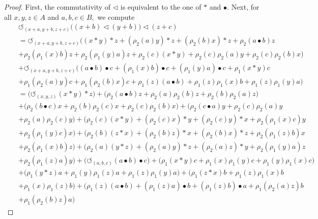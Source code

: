 \documentclass[12pt]{amsart}
\begin{document}
	\begin{proof} First, the commutativity of $\triangleleft$ is equivalent to the one of $\ast$ and $\bullet$. Next, for all $x,y,z\in A$ and $a,b,c\in B,$ we compute
		\begin{eqnarray}
			&&\circlearrowleft_{(x+a,y+b,z+c)}\Big((x+b)\triangleleft(y+b) \Big)\triangleleft(z+c)\nonumber\\
			&&=
			\circlearrowleft_{(x+a,y+b,z+c)}\Big( (x\ast y)\ast z+(\rho_2(a)y)\ast z+(\rho_2(b)x)\ast z+\rho_2(a\bullet b)z\nonumber\\
			&&+\rho_2(\rho_1(x)b)z+\rho_2(\rho_1(y)a)z+\rho_2(c)(x\ast y)+\rho_2(c)\rho_2(a)y+\rho_2(c)\rho_2(b)x\Big)\nonumber\\
			&&+\circlearrowleft_{(x+a,y+b,z+c)}\Big( (a\bullet b)\bullet c+(\rho_1(x)b)\bullet c+(\rho_1(y)a)\bullet c+\rho_1(x\ast y)c\nonumber\\
			&&+\rho_1(\rho_2(a)y)c+\rho_1(\rho_2(b)x)c+\rho_1(z)(a\bullet b)+\rho_1(z)\rho_1(x)b+\rho_1(z)\rho_1(y)a\Big)\nonumber
		\end{eqnarray}
		\begin{eqnarray}
			&&=\Big( \circlearrowleft_{(x,y,z)}(x\ast y)\ast z\Big)+\Big( \rho_2(a\bullet b)z+\rho_2(a)\rho_2(b)z+\rho_2(b)\rho_2(a)z\Big)\nonumber\\
			&&+\Big( \rho_2(b\bullet c)x+\rho_2(b)\rho_2(c)x+\rho_2(c)\rho_2(b)x\Big)+
			\Big( \rho_2(c\bullet a)y+\rho_2(c)\rho_2(a)y\nonumber\\
			&&+\rho_2(a)\rho_2(c)y\Big)+\Big( \rho_2(c)(x\ast y)+(\rho_2(c)x)\ast y+(\rho_2(c)y)\ast x +\rho_2(\rho_1(x)c)y\nonumber\\
			&&+\rho_2(\rho_1(y)c)x\Big)
			+\Big( \rho_2(b)(z\ast x)+(\rho_2(b)z)\ast x+(\rho_2(b)x)\ast z +\rho_2(\rho_1(z)b)x\nonumber\\
			&&+\rho_2(\rho_1(x)b)z\Big)
			+\Big( \rho_2(a)(y\ast z)+(\rho_2(a)y)\ast z+(\rho_2(a)z)\ast y +\rho_2(\rho_1(y)a)z\nonumber\\
			&&+\rho_2(\rho_1(z)a)y\Big)+\Big( \circlearrowleft_{(a,b,c)}(a\bullet b)\bullet c\Big)+\Big( \rho_1(x\ast y)c+\rho_1(x)\rho_1(y)c+\rho_1(y)\rho_1(x)c\Big)\nonumber\\
			&&+\Big( \rho_1(y\ast z)a+\rho_1(y)\rho_1(z)a+\rho_1(z)\rho_1(y)a\Big)+
			\Big( \rho_1(z\ast x)b+\rho_1(z)\rho_1(x)b\nonumber\\
			&&+\rho_1(x)\rho_1(z)b\Big)+\Big( \rho_1(z)(a\bullet b)+(\rho_1(z)a)\bullet b+(\rho_1(z)b)\bullet a +\rho_1(\rho_2(a)z)b\nonumber\\
			&&+\rho_1(\rho_2(b)z)a\Big)

\end{eqnarray}
\end{proof}
\end{document}
